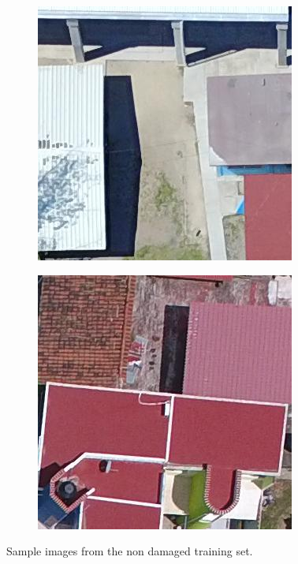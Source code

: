\begin{figure}[!ht]
\begin{subfigure}{.24\textwidth}
    \end{subfigure}
    \begin{subfigure}{.24\textwidth}
        \includegraphics[width=\textwidth]{images/nondamaged7.jpg}
    \end{subfigure}
    \begin{subfigure}{.24\textwidth}
        \includegraphics[width=\textwidth]{images/nondamaged8.jpg}
    \end{subfigure}
  \caption{Sample images from the non damaged training set.}
  \label{fig:nondamaged}
\end{figure}

